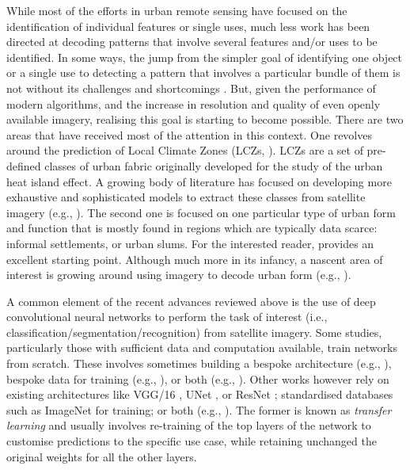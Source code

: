 \documentclass[]{interact}
\theoremstyle{plain}%
\theoremstyle{definition}
\theoremstyle{remark}
\begin{document}
While most of the efforts in urban remote sensing have focused on the
identification of individual features or single uses, much less work has been
directed at decoding patterns that involve several features and/or uses to be
identified.
In some ways, the jump from the simpler goal of identifying one object or a
single use to detecting a pattern that involves a particular bundle of them is
not without its challenges and shortcomings \citep{wang2022knowledge}.
But, given the performance of modern algorithms, and the increase in
resolution and quality of even openly available imagery, realising this goal
is starting to become possible.
There are two areas that have received most of the attention in this context.
One revolves around the prediction of Local Climate Zones (LCZs,
\citealp{stewart2012}). LCZs are a set of pre-defined classes of urban
fabric originally developed for the study of the urban heat island effect. A
growing body of literature has focused on developing more exhaustive and
sophisticated models to extract these classes from satellite imagery (e.g.,
\citealp{koc2017mapping, wang2018mapping, liu2020local, taubenbock2020, zhou2021parcel, zhou2022deep}).
The second one is focused on one particular type of urban form and function
that is mostly found in regions which are typically data scarce: informal
settlements, or urban slums. For the interested reader, \cite{slums2016}
provides an excellent starting point.
Although much more in its infancy, a nascent area of interest is growing
around using imagery to decode urban form (e.g., \citealp{04f9ab8f6c714010ac39b58230f59d85}).

A common element of the recent advances reviewed above is the use of deep
convolutional neural networks to perform the task of interest (i.e.,
classification/segmentation/recognition) from satellite imagery.
Some studies, particularly those with sufficient data and computation available, train
networks from scratch. These involves sometimes building a bespoke
architecture (e.g., \citealp{othman2017domain}), bespoke data for training (e.g.,
\citealp{qiu2020fusing, karra2021global}), or both (e.g.,
\citealp{taubenbock2020, zhu2022urban, sharma2017patch, wang2018multi}).
Other works however rely on existing architectures like VGG/16
\citep{simonyan2014very}, UNet \citep{ronneberger2015u}, or ResNet
\citep{he2016deep}; standardised databases such as ImageNet \citep{ILSVRC15} for
training; or both (e.g., \citealp{qiu2020fusing,
karra2021global, srivastava2019understanding}). The former is known as \textit{transfer learning} and
usually involves re-training of the top layers of the network to customise
predictions to the specific use case, while retaining unchanged the original
weights for all the other layers.
\end{document}
